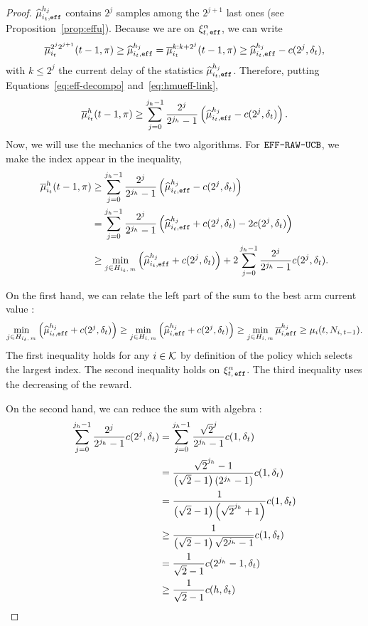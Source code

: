 \begin{proof}
$\widehat{\mu}_{i_t,\texttt{eff}}^{h_j}$ contains $2^j$ samples among the $2^{j+1}$ last ones (see Proposition~\ref{prop:effu}). Because we are on $\xi^\alpha_{t,\, \texttt{eff}}$,  we can write
\begin{equation}
\label{eq:hmueff-link}
\overline{\mu}^{2^{j}2^{j+1}}_{i_t}(t-1,\pi) \geq \widehat{\mu}_{i_t,\texttt{eff}}^{h_j} = \overline{\mu}^{k : k+2^{j}}_{i_t}(t-1,\pi)\geq  \widehat{\mu}_{i_t,\texttt{eff}}^{h_j} - c(2^j, \delta_t),
\end{equation}
with $k\leq 2^j$ the current delay of the statistics $\widehat{\mu}_{i_t,\texttt{eff}}^{h_j}$. Therefore, putting Equations~\ref{eq:eff-decompo} and~\ref{eq:hmueff-link}, 
\begin{equation*}
\overline{\mu}^{h}_{i_t}(t-1,\pi) \geq \sum_{j=0}^{j_h-1} \frac{2^j}{2^{j_h}-1} \left(\widehat{\mu}_{i_t,\texttt{eff}}^{h_j} - c(2^j, \delta_t)\right).
\end{equation*}
Now, we will use the mechanics of the two algorithms. For $\normalfont \texttt{EFF-RAW-UCB}$, we make the index appear in the inequality,
\begin{align*}
 \overline{\mu}^{h}_{i_t}(t-1,\pi) &\geq \sum_{j=0}^{j_h-1} \frac{2^j}{2^{j_h}-1} \left(\widehat{\mu}_{i_t,\texttt{eff}}^{h_j} - c(2^j, \delta_t)\right)\\
 &=\sum_{j=0}^{j_h-1} \frac{2^j}{2^{j_h}-1} \left(\widehat{\mu}_{i_t,\texttt{eff}}^{h_j} + c(2^j, \delta_t) - 2c(2^j, \delta_t)\right)\\
 &\geq \min_{j \in H_{i_t,\,m}} \left(\widehat{\mu}_{i_t,\texttt{eff}}^{h_j} + c(2^j, \delta_t)\right) + 2 \sum_{j=0}^{j_h-1} \frac{2^{j}}{2^{j_h}-1} c(2^j, \delta_t).
 \end{align*}
 
 On the first hand, we can relate the left part of the sum to the best arm current value :
 \begin{equation*}
\min_{j \in H_{i_t,\,m}} \left(\widehat{\mu}_{i_t,\texttt{eff}}^{h_j} + c(2^j, \delta_t)\right) \geq \min_{j \in H_{i,\,m}} \left(\widehat{\mu}_{i,\texttt{eff}}^{h_j} + c(2^j, \delta_t)\right)\geq \min_{j \in H_{i,\,m}} \overline{\mu}_{i,\texttt{eff}}^{h_j} \geq \mu_i(t,N_{i,\,t-1}).
 \end{equation*}
The first inequality holds for any $i \in \mathcal{K}$ by definition of the policy which selects the largest index. The second inequality holds on $\xi^\alpha_{t,\, \texttt{eff}}$. The third inequality uses the decreasing of the reward. 

On the second hand, we can reduce the sum with algebra : 
\begin{align*}
\sum_{j=0}^{j_h-1} \frac{2^{j}}{2^{j_h}-1} c(2^j, \delta_t) &= \sum_{j=0}^{j_h-1} \frac{\sqrt{2}^{j}}{2^{j_h}-1} c(1, \delta_t) \\
& = \frac{\sqrt{2}^{j_h} -1 }{\left(\sqrt{2}-1\right)\left(2^{j_h}-1\right)}c(1, \delta_t) \\
& = \frac{1}{\left(\sqrt{2}-1\right)\left(\sqrt{2}^{j_h} +1\right)} c(1, \delta_t)\\
& \geq  \frac{1}{\left(\sqrt{2}-1\right)\sqrt{2^{j_h}-1}} c(1, \delta_t) \\
& = \frac{1}{\sqrt{2}-1} c(2^{j_h}-1, \delta_t) \\
& \geq \frac{1}{\sqrt{2}-1} c(h, \delta_t)
\end{align*}





\end{proof}

